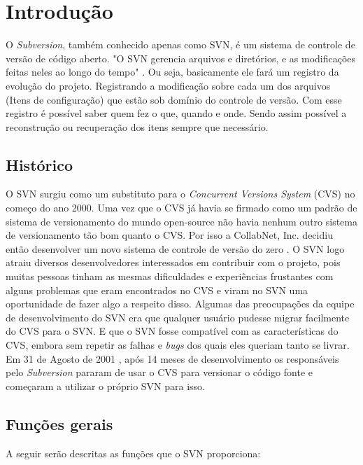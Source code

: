 \chapter[Introdução]{Introdução}

  O \textit{Subversion}, também conhecido apenas como SVN, é um sistema de controle de versão de código aberto. "O SVN gerencia arquivos e diretórios, e as modificações feitas neles ao longo do tempo" \cite{svn-book}.
  Ou seja, basicamente ele fará um registro da evolução do projeto. Registrando a modificação sobre cada um dos arquivos (Itens de configuração) que estão sob domínio do controle de versão. Com esse registro é possível saber quem fez o que, quando e onde. Sendo assim possível a reconstrução ou recuperação dos itens sempre que necessário.

\section{Histórico}

  O SVN surgiu como um substituto para o \textit{Concurrent Versions System} (CVS) \cite{cvs-book} no começo do ano 2000. Uma vez que o CVS já havia se firmado como um padrão de sistema de versionamento do mundo open-source não havia nenhum outro sistema de versionamento tão bom quanto o CVS. Por isso a CollabNet, Inc. decidiu então desenvolver um novo sistema de controle de versão do zero \cite{svn-book}.
  O SVN logo atraiu diversos desenvolvedores interessados em contribuir com o projeto, pois muitas pessoas tinham as mesmas dificuldades e experiências frustantes com alguns problemas que eram encontrados no CVS e viram no SVN uma oportunidade de fazer algo a respeito disso.
  Algumas das preocupações da equipe de desenvolvimento do SVN era que qualquer usuário pudesse migrar facilmente do CVS para o SVN. E que o SVN fosse compatível com as características do CVS, embora sem repetir as falhas e \textit{bugs} dos quais eles queriam tanto se livrar.
  Em 31 de Agosto de 2001 \cite{svn-book}, após 14 meses de desenvolvimento os responsáveis pelo \textit{Subversion} pararam de usar o CVS para versionar o código fonte e começaram a utilizar o próprio SVN para isso.

\section{Funções gerais}

  A seguir serão descritas as funções que o SVN proporciona:

